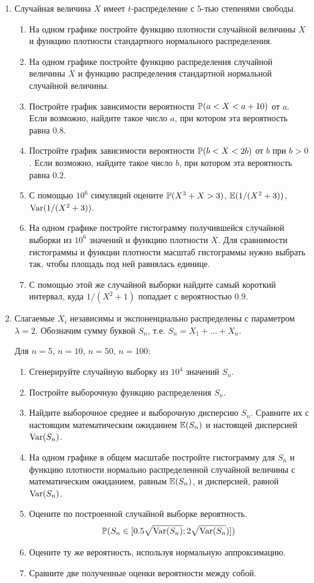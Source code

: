 \documentclass[12pt, a4paper]{article}\usepackage[]{graphicx}\usepackage[]{color}
\begin{document}
				\begin{enumerate}
					\item Случайная величина $X$ имеет $t$-распределение с $5$-тью степенями свободы.
					\begin{enumerate}
						\item На одном графике постройте функцию плотности случайной величины $X$ и функцию плотности стандартного нормального распределения.
						\item На одном графике постройте функцию распределения случайной величины $X$ и функцию распределения стандартной нормальной случайной величины.
						\item Постройте график зависимости вероятности $\P(a<X<a+10)$ от $a$. Если возможно, найдите такое число $a$, при котором эта вероятность равна $0.8$.
						\item Постройте график зависимости вероятности $\P(b<X<2b)$ от $b$ при $b>0$. Если возможно, найдите такое число $b$, при котором эта вероятность равна $0.2$.
						\item С помощью $10^6$ симуляций оцените $\P(X^3+X>3)$, $\E(1/(X^2+3))$, $\Var(1/(X^2+3))$.
						\item На одном графике постройте гистограмму получившейся случайной выборки из $10^6$ значений и функцию плотности $X$. Для сравнимости гистограммы и функции плотности масштаб гистограммы нужно выбрать так, чтобы площадь под ней равнялась единице.
						\item С помощью этой же случайной выборки найдите самый короткий интервал, куда $1/(X^2+1)$ попадает с вероятностью $0.9$.
					\end{enumerate}


					\item Слагаемые $X_i$ независимы и экспоненциально распределены с параметром $\lambda=2$. Обозначим сумму буквой $S_n$, т.е. $S_n=X_1+\ldots+X_n$.

					Для $n=5$, $n=10$, $n=50$, $n=100$:

					\begin{enumerate}
						\item Сгенерируйте случайную выборку из $10^4$ значений $S_n$.
						\item Постройте выборочную функцию распределения $S_n$.
						\item Найдите выборочное среднее и выборочную дисперсию $S_n$. Сравните их с настоящим математическим ожиданием $\E(S_n)$ и настоящей дисперсией $\Var(S_n)$.
						\item На одном графике в общем масштабе постройте гистограмму для $S_n$ и функцию плотности нормально распределенной случайной величины с математическим ожиданием, равным $\E(S_n)$, и дисперсией, равной $\Var(S_n)$.
						\item Оцените по построенной случайной выборке вероятность.
						\[ \P(S_n \in [0.5 \sqrt{\Var(S_n)} ; 2\sqrt{\Var(S_n}) ]) \]
						\item Оцените ту же вероятность, используя нормальную аппроксимацию.
						\item Сравните две полученные оценки вероятности между собой.
					\end{enumerate}



\end{enumerate}
\end{document}
